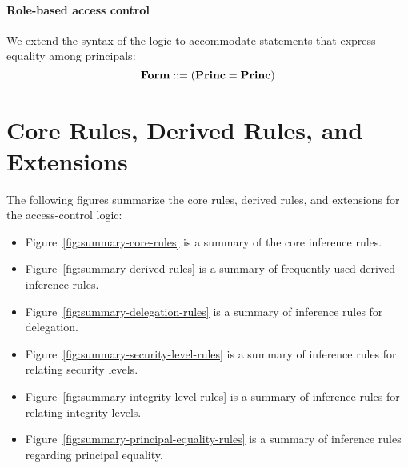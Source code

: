 \paragraph*{Role-based access control}

We extend the syntax of the logic to accommodate statements that
express equality among principals:
\[ \textbf{Form} ::=  (\textbf{Princ} = \textbf{Princ}) \]

\section{Core Rules, Derived Rules, and Extensions}

The following figures summarize the core rules, derived rules, and
extensions for the access-control logic:
\begin{itemize}
\item Figure~\ref{fig:summary-core-rules} is a summary of the core
  inference rules.
\item Figure~\ref{fig:summary-derived-rules} is a summary of
  frequently used derived inference rules.
\item Figure~\ref{fig:summary-delegation-rules} is a summary of
  inference rules for delegation.
\item Figure~\ref{fig:summary-security-level-rules} is a summary of
  inference rules for relating security levels.
\item Figure~\ref{fig:summary-integrity-level-rules} is a summary of
  inference rules for relating integrity levels.
\item Figure~\ref{fig:summary-principal-equality-rules} is a summary
  of inference rules regarding principal equality.
\end{itemize}


